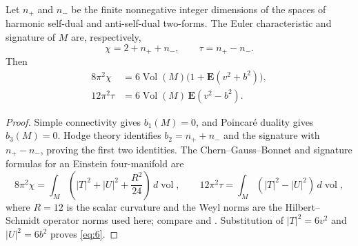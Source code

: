 \begin{proposition}
\label{prop:characteristic-identities}
Let $n_+$ and $n_-$ be the finite nonnegative integer dimensions of
the spaces of harmonic self-dual and anti-self-dual two-forms. The Euler
characteristic and signature of $M$ are, respectively,
\[
 \chi=2+n_++n_-,\qquad \tau=n_+-n_-.
\]
Then
\begin{equation}
 \begin{aligned}
 8\pi^2\chi
   &=6\operatorname{Vol}(M)
        \bigl(1+\mathbf E(v^2+b^2)\bigr),\\
 12\pi^2\tau
   &=6\operatorname{Vol}(M)\,\mathbf E(v^2-b^2).
 \end{aligned}
 \tag{6}\label{eq:6}
\end{equation}
\end{proposition}

\begin{proof}
Simple connectivity gives $b_1(M)=0$, and Poincar\'e duality gives
$b_3(M)=0$. Hodge theory identifies $b_2=n_++n_-$ and the signature
with $n_+-n_-$, proving the first two identities. The
Chern--Gauss--Bonnet and signature formulas for an Einstein
four-manifold are
\[
 8\pi^2\chi=\int_M\left(|T|^2+|U|^2+\frac{R^2}{24}\right)
                 \,d\operatorname{vol},\qquad
 12\pi^2\tau=\int_M(|T|^2-|U|^2)\,d\operatorname{vol},
\]
where $R=12$ is the scalar curvature and the Weyl norms are the
Hilbert--Schmidt operator norms used here; compare
\cite[Proposition~3.4]{OpenAI2026P} and
\cite[Theorems~1.7.6 and 4.8.16]{Gilkey1984}.
Substitution of $|T|^2=6v^2$ and $|U|^2=6b^2$ proves
\eqref{eq:6}.
\end{proof}
